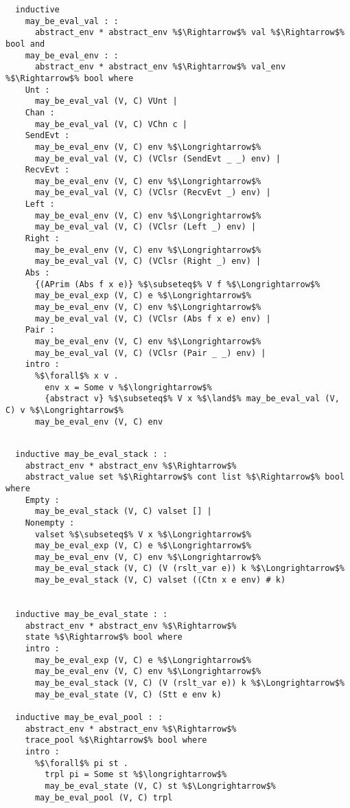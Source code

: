 \documentclass{article}
\begin{document}
\begin{lstlisting}[style=codestyle1, escapechar=\%]



  inductive 
    may_be_eval_val : :
      abstract_env * abstract_env %$\Rightarrow$% val %$\Rightarrow$% bool and  
    may_be_eval_env : :
      abstract_env * abstract_env %$\Rightarrow$% val_env %$\Rightarrow$% bool where
    Unt :
      may_be_eval_val (V, C) VUnt |
    Chan :
      may_be_eval_val (V, C) VChn c |
    SendEvt :
      may_be_eval_env (V, C) env %$\Longrightarrow$%
      may_be_eval_val (V, C) (VClsr (SendEvt _ _) env) |
    RecvEvt :
      may_be_eval_env (V, C) env %$\Longrightarrow$%
      may_be_eval_val (V, C) (VClsr (RecvEvt _) env) |
    Left :
      may_be_eval_env (V, C) env %$\Longrightarrow$%
      may_be_eval_val (V, C) (VClsr (Left _) env) |
    Right :
      may_be_eval_env (V, C) env %$\Longrightarrow$%
      may_be_eval_val (V, C) (VClsr (Right _) env) |
    Abs :
      {(APrim (Abs f x e)} %$\subseteq$% V f %$\Longrightarrow$% 
      may_be_eval_exp (V, C) e %$\Longrightarrow$% 
      may_be_eval_env (V, C) env %$\Longrightarrow$%
      may_be_eval_val (V, C) (VClsr (Abs f x e) env) |
    Pair :
      may_be_eval_env (V, C) env %$\Longrightarrow$%
      may_be_eval_val (V, C) (VClsr (Pair _ _) env) |
    intro :  
      %$\forall$% x v .
        env x = Some v %$\longrightarrow$%
        {abstract v} %$\subseteq$% V x %$\land$% may_be_eval_val (V, C) v %$\Longrightarrow$%
      may_be_eval_env (V, C) env

  \end{lstlisting}
\begin{lstlisting}[style=codestyle1, escapechar=\%]

  inductive may_be_eval_stack : :
    abstract_env * abstract_env %$\Rightarrow$%
    abstract_value set %$\Rightarrow$% cont list %$\Rightarrow$% bool where
    Empty :
      may_be_eval_stack (V, C) valset [] |
    Nonempty : 
      valset %$\subseteq$% V x %$\Longrightarrow$%
      may_be_eval_exp (V, C) e %$\Longrightarrow$%
      may_be_eval_env (V, C) env %$\Longrightarrow$%
      may_be_eval_stack (V, C) (V (rslt_var e)) k %$\Longrightarrow$%
      may_be_eval_stack (V, C) valset ((Ctn x e env) # k)


  inductive may_be_eval_state : :
    abstract_env * abstract_env %$\Rightarrow$%
    state %$\Rightarrow$% bool where
    intro :
      may_be_eval_exp (V, C) e %$\Longrightarrow$%
      may_be_eval_env (V, C) env %$\Longrightarrow$%
      may_be_eval_stack (V, C) (V (rslt_var e)) k %$\Longrightarrow$%
      may_be_eval_state (V, C) (Stt e env k)

  inductive may_be_eval_pool : :
    abstract_env * abstract_env %$\Rightarrow$%
    trace_pool %$\Rightarrow$% bool where
    intro :
      %$\forall$% pi st .
        trpl pi = Some st %$\longrightarrow$%
        may_be_eval_state (V, C) st %$\Longrightarrow$% 
      may_be_eval_pool (V, C) trpl

  \end{lstlisting}
\end{document}
